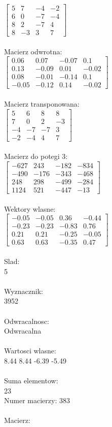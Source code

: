 \documentclass[a4paper,12pt]{article}
\begin{document}
$\begin{bmatrix} 5&7&-4&-2\\6&0&-7&-4\\8&2&-7&4\\8&-3&3&7 \end{bmatrix}$
\\
\\
Macierz odwrotna:\\

$\begin{bmatrix} 0.06&0.07&-0.07&0.1\\0.13&-0.09&0.01&-0.02\\0.08&-0.01&-0.14&0.1\\-0.05&-0.12&0.14&-0.02 \end{bmatrix}$
\\
\\
Macierz transponowana:\\

$\begin{bmatrix} 5&6&8&8\\7&0&2&-3\\-4&-7&-7&3\\-2&-4&4&7 \end{bmatrix}$
\\
\\
Macierz do potegi 3:\\

$\begin{bmatrix} -627&243&-182&-834\\-490&-176&-343&-468\\248&298&-499&-284\\1124&521&-447&-13 \end{bmatrix}$
\\
\\
Wektory wlasne:\\

$\begin{bmatrix} -0.05&-0.05&0.36&-0.44\\-0.23&-0.23&-0.83&0.76\\0.21&0.21&-0.25&-0.05\\0.63&0.63&-0.35&0.47 \end{bmatrix}$
\\
\\
Slad:\\
5
\\
\\
Wyznacznik:\\
3952
\\
\\
Odwracalnosc:\\
Odwracalna
\\
\\
Wartosci wlasne:\\
8.44 8.44 -6.39 -5.49
\\
\\
Suma elementow:\\
23
\\
\newpage
Numer macierzy:
383
\\
\\
Macierz:\\
\end{document}
